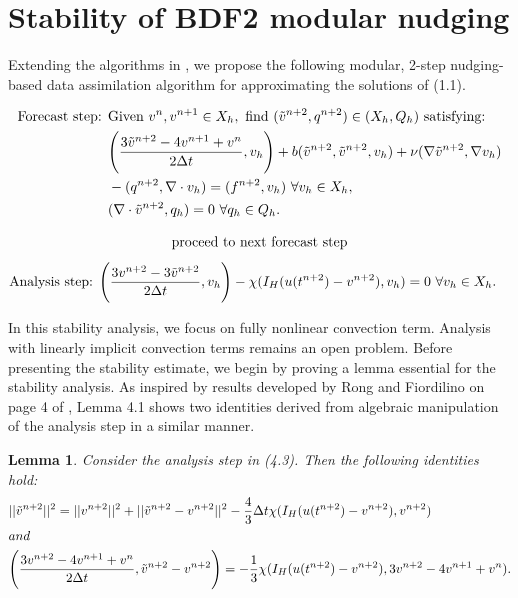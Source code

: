 \documentclass[11pt,a4paper]{article}
\newtheorem{lemma}[theorem]{Lemma}
\begin{document}
\section{Stability of BDF2 modular nudging}

Extending the algorithms in \cite{Fang:2025}, we propose the following modular, 2-step nudging-based data assimilation algorithm for approximating the solutions of (1.1).

\begin{algorithm}[H]
\caption{}\label{alg:cap1}
\begin{algorithmic}
\STATE \begin{align}
    \text{Forecast step: } 
    &\text{Given } v^n, v^{n+1} \in X_h, \text{ find } (\Tilde{v}^{n+2}, q^{n+2}) \in (X_h, Q_h) \text{ satisfying:} \notag \\ 
    &\Bigg(\frac{3\Tilde{v}^{n+2}-4v^{n+1}+v^n}{2\Delta t}, v_h\Bigg)+b(\Tilde{v}^{n+2}, \Tilde{v}^{n+2}, v_h) + \nu (\nabla \Tilde{v}^{n+2}, \nabla v_h) \\
    &- (q^{n+2}, \nabla \cdot v_h)=(f^{n+2},v_h) \text{ } \forall v_h \in X_h,  \notag \\ 
    &(\nabla \cdot \Tilde{v}^{n+2}, q_h) = 0 \text{ } \forall q_h \in Q_h.
\end{align}

    \STATE \begin{align}
        \text{proceed to next forecast step} \notag 
    \end{align}
\ELSE 
\STATE \begin{align}
    \text{Analysis step: }
    &\Bigg(\frac{3v^{n+2}-3\Tilde{v}^{n+2}}{2\Delta t}, v_h\Bigg) -\chi (I_H(u(t^{n+2})-v^{n+2}), v_h)=0 \text{ } \forall v_h \in X_h.
\end{align}
\ENDIF

\end{algorithmic}
\end{algorithm}

In this stability analysis, we focus on fully nonlinear convection term. Analysis with linearly implicit convection terms remains an open problem. Before presenting the stability estimate, we begin by proving a lemma essential for the stability analysis. As inspired by results developed by Rong and Fiordilino on page 4 of \cite{Rong:2018}, Lemma 4.1 shows two identities derived from algebraic manipulation of the analysis step in a similar manner.

\begin{lemma}
    Consider the analysis step in (4.3). Then the following identities hold:
    \begin{align}
        &||\Tilde{v}^{n+2}||^2=||v^{n+2}||^2+||\Tilde{v}^{n+2}-v^{n+2}||^2-\frac{4}{3}\Delta t\chi (I_H(u(t^{n+2})-v^{n+2}),v^{n+2}) \\
        & and \notag \\
        &\Bigg(\frac{3v^{n+2}-4v^{n+1}+v^n}{2\Delta t}, \Tilde{v}^{n+2}-v^{n+2}\Bigg)=-\frac{1}{3}\chi (I_H(u(t^{n+2})-v^{n+2}),3v^{n+2}-4v^{n+1}+v^n).
    \end{align}
\end{lemma}
\end{document}

